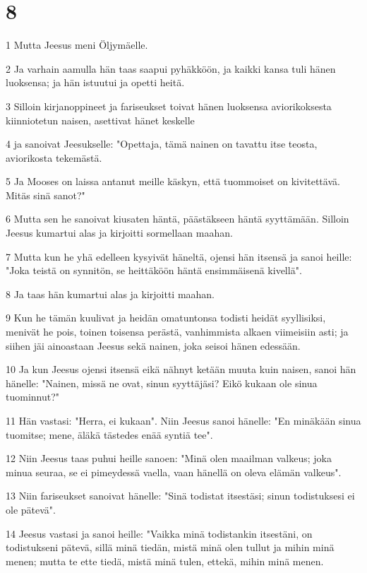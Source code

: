\chapter{8}

\par 1 Mutta Jeesus meni Öljymäelle.
\par 2 Ja varhain aamulla hän taas saapui pyhäkköön, ja kaikki kansa tuli hänen luoksensa; ja hän istuutui ja opetti heitä.
\par 3 Silloin kirjanoppineet ja fariseukset toivat hänen luoksensa aviorikoksesta kiinniotetun naisen, asettivat hänet keskelle
\par 4 ja sanoivat Jeesukselle: "Opettaja, tämä nainen on tavattu itse teosta, aviorikosta tekemästä.
\par 5 Ja Mooses on laissa antanut meille käskyn, että tuommoiset on kivitettävä. Mitäs sinä sanot?"
\par 6 Mutta sen he sanoivat kiusaten häntä, päästäkseen häntä syyttämään. Silloin Jeesus kumartui alas ja kirjoitti sormellaan maahan.
\par 7 Mutta kun he yhä edelleen kysyivät häneltä, ojensi hän itsensä ja sanoi heille: "Joka teistä on synnitön, se heittäköön häntä ensimmäisenä kivellä".
\par 8 Ja taas hän kumartui alas ja kirjoitti maahan.
\par 9 Kun he tämän kuulivat ja heidän omatuntonsa todisti heidät syyllisiksi, menivät he pois, toinen toisensa perästä, vanhimmista alkaen viimeisiin asti; ja siihen jäi ainoastaan Jeesus sekä nainen, joka seisoi hänen edessään.
\par 10 Ja kun Jeesus ojensi itsensä eikä nähnyt ketään muuta kuin naisen, sanoi hän hänelle: "Nainen, missä ne ovat, sinun syyttäjäsi? Eikö kukaan ole sinua tuominnut?"
\par 11 Hän vastasi: "Herra, ei kukaan". Niin Jeesus sanoi hänelle: "En minäkään sinua tuomitse; mene, äläkä tästedes enää syntiä tee".
\par 12 Niin Jeesus taas puhui heille sanoen: "Minä olen maailman valkeus; joka minua seuraa, se ei pimeydessä vaella, vaan hänellä on oleva elämän valkeus".
\par 13 Niin fariseukset sanoivat hänelle: "Sinä todistat itsestäsi; sinun todistuksesi ei ole pätevä".
\par 14 Jeesus vastasi ja sanoi heille: "Vaikka minä todistankin itsestäni, on todistukseni pätevä, sillä minä tiedän, mistä minä olen tullut ja mihin minä menen; mutta te ette tiedä, mistä minä tulen, ettekä, mihin minä menen.

